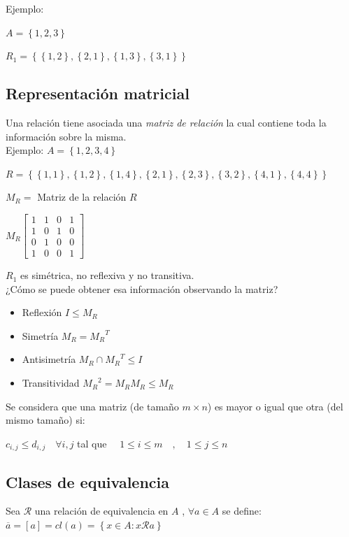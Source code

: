 Ejemplo:

$ A = \left\{1,2,3\right\}$

$R_1 = \left\{ \left\{ 1,2\right\} , \left\{ 2,1\right\} , \left\{ 1,3\right\} , \left\{ 3,1\right\} \right\}$

\subsection{Representación matricial}
Una relación tiene asociada una \emph{matriz de relación} la cual contiene toda la información sobre la misma.\\

Ejemplo:
$A = \left\{1,2,3,4\right\}$

$R = \left\{ \left\{ 1,1\right\} , \left\{ 1,2\right\} , \left\{ 1,4\right\} , \left\{ 2,1\right\} , \left\{ 2,3\right\} , \left\{ 3,2\right\} , \left\{ 4,1\right\} , \left\{ 4,4\right\} \right\}$

$M_R =$ Matriz de la relación $R$ 

$ M_R \left[\begin{array}{cccc}
1 & 1 & 0 & 1\\
1 & 0 & 1 & 0\\
0 & 1 & 0 & 0\\
1 & 0 & 0 & 1\end{array}\right]$

$R_1$ es simétrica, no reflexiva y no transitiva.\\

¿Cómo se puede obtener esa información observando la matriz?

\begin{itemize}
	\item{Reflexión} $I \leq M_R$
	\item{Simetría} $M_R = {M_R}^T$
	\item{Antisimetría} $M_R \cap {M_R}^T \leq I$
	\item{Transitividad} ${M_R}^2 = M_R M_R \leq M_R$
\end{itemize}

Se considera que una matriz (de tamaño $m \times n$) es mayor o igual que otra (del mismo tamaño) si:
\begin{center}
	$c_{i,j} \leq d_{i,j} \quad \forall i,j$ tal que $\quad 1 \leq i \leq m \quad , \quad 1 \leq j \leq n $
\end{center}

\subsection{Clases de equivalencia}
Sea $\mathcal{R}$ una relación de equivalencia en $A$ , $\forall a \in A $ se define:
$\overline{a} = \left[a\right] = cl(a) = \left\{x \in A: x\mathcal{R} a\right\}$\\

